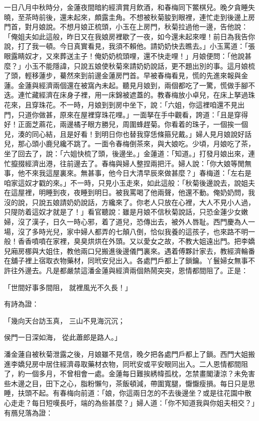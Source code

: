 \begin{showcontents}{}
一日八月中秋時分，金蓮夜間暗約經濟賞月飲酒，和春梅同下鱉棋兒。晚夕貪睡失曉，至茶時前後，還未起來，頗露圭角。不想被秋菊朘到眼裡，連忙走到後邊上房門首，對月娘說。不想月娘正梳頭，小玉在上房門，秋菊拉過他一邊，告他說：「俺姐夫如此這般，昨日又在我娘房裡歇了一夜，如今還未起來哩！前日為我告你說，打了我一頓。今日真實看見，我須不賴他。請奶奶快去瞧去。」小玉罵道：「張眼露睛奴才，又來葬送主子！俺奶奶梳頭哩，還不快走哩！」月娘便問：「他說甚麼？」小玉不能隱諱，只說五娘使秋菊來請奶奶說話，更不題出別的事。這月娘梳了頭，輕移蓮步，驀然來到前邊金蓮房門首。早被春梅看見，慌的先進來報與金蓮。金蓮與經濟兩個還在被窩內未起。聽見月娘到，兩個都吃了一驚，慌做手腳不迭。連忙藏經濟在床身子裡，用一床錦被遮蓋的。教春梅放小卓兒，在床上拏過珠花來，且穿珠花。不一時，月娘到到房中坐下，說：「六姐，你這裡咱還不見出門，只道你做甚，原來在屋裡穿珠花哩。」一面拏在手中觀看，誇道：「且是穿得好！正面芝蔴花，兩邊橘子眼方勝兒，周圍蜂趕菊。你看着的珠子，一個挨一個兒，湊的同心結，且是好看！到明日你也替我穿恁條箍兒戴。」婦人見月娘說好話兒，那心頭小鹿兒纔不跳了。一面令春梅倒茶來，與大娘吃。少頃，月娘吃了茶，坐了回去了，說：「六姐快梳了頭，後邊坐。」金蓮道：「知道。」打發月娘出來，連忙攛掇經濟出港，往前邊去了。春梅與婦人整捏兩把汗。婦人說：「你大娘等閒無事，他不來我這屋裏來。無甚事，他今日大清早辰來做甚麼？」春梅道：「左右是咱家這奴才戳的來。」不一時，只見小玉走來，如此這般：「秋菊後邊說去，說姐夫在這屋裡，明睡到夜，夜睡到明日。被我罵喝了他兩聲，他還不動。俺奶奶問，我沒的說，只說五娘請奶奶說話，方纔來了。你老人只放在心裡，大人不見小人過，只隄防着這奴才就是了！」看官聽說：雖是月娘不信秋菊說話，只恐金蓮少女嫩婦，沒了漢子，日久一時心邪，着了道兒，恐傳出去，被外人唇耻。西門慶為人一場，沒了多時光兒，家中婦人都弄的七顛八倒，恰似我養的這孩子，也來路不明一般！香香噴噴在家裡，臭臭烘烘在外頭。又以愛女之故，不教大姐遠出門。把李嬌兒廂房梛與大姐住，教他兩口兒搬進後邊儀門裏來。遇着傅夥計家去，教經濟輪番在舖子裡上宿取衣物藥材，同玳安兒出入。各處門戶都上了鎖鑰。丫鬟婦女無事不許往外邊去。凡是都嚴禁這潘金蓮與經濟兩個熱鬧突突，恩情都間阻了。正是：

「世間好事多間阻，  就裡風光不久長！」

有詩為證：

「幾向天台訪玉真，  三山不見海沉沉；

侯門一日深如海，  從此蕭郎是路人。」

潘金蓮自被秋菊泄露之後，月娘雖不見信，晚夕把各處門戶都上了鎖。西門大姐搬進李嬌兒房中居住經濟尋取藥材衣物，同玳安或平安眼同出入。二人恩情都間阻了，約一個多月，不曾相會一處。金蓮每日難挨綉幃孤枕，怎禁畫閣淒涼？未免害些木邊之目，田下之心，脂粉懶勻，茶飯頓減，帶圍寬腿，懨懨瘦損。每日只是思睡，扶頭不起。有春梅向前道：「娘，你這兩日怎的不去後邊坐？或是往花園中散心走走？每日短嘆長吁，端的為些甚麼？」婦人道：「你不知道我與你姐夫相交？」有鴈兒落為證：


\end{showcontents}
